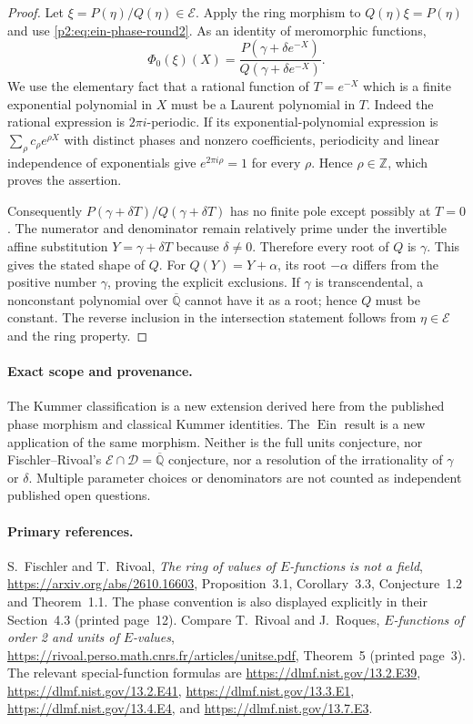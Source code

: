 \documentclass[11pt,a4paper]{article}
\theoremstyle{definition}
\theoremstyle{remark}
\numberwithin{equation}{section}
\begin{document}
\begin{proof}
Let $\xi=P(\eta)/Q(\eta)\in\mathcal E$.  Apply the ring morphism
to $Q(\eta)\xi=P(\eta)$ and use
\eqref{p2:eq:ein-phase-round2}.  As an identity of meromorphic functions,
\[
 \Phi_0(\xi)(X)=
  \frac{P(\gamma+\delta e^{-X})}
       {Q(\gamma+\delta e^{-X})}.
\]
We use the elementary fact that a rational function of $T=e^{-X}$
which is a finite exponential polynomial in $X$ must be a Laurent
polynomial in $T$.  Indeed the rational expression is $2\pi i$-periodic.
If its exponential-polynomial expression is
$\sum_{\rho}c_\rho e^{\rho X}$ with distinct phases and nonzero
coefficients, periodicity and linear independence of exponentials give
$e^{2\pi i\rho}=1$ for every $\rho$.  Hence $\rho\in\mathbb Z$,
which proves the assertion.

Consequently $P(\gamma+\delta T)/Q(\gamma+\delta T)$ has no finite
pole except possibly at $T=0$.  The numerator and denominator remain
relatively prime under the invertible affine substitution
$Y=\gamma+\delta T$ because $\delta\ne0$.  Therefore every root of
$Q$ is $\gamma$.  This gives the stated shape of $Q$.
For $Q(Y)=Y+\alpha$, its root $-\alpha$ differs from the positive
number $\gamma$, proving the explicit exclusions.
If $\gamma$ is transcendental, a nonconstant polynomial over
$\overline{\mathbb Q}$ cannot have it as a root; hence $Q$ must be
constant.  The reverse inclusion in the intersection statement follows
from $\eta\in\mathcal E$ and the ring property.
\end{proof}

\paragraph{Exact scope and provenance.}
The Kummer classification is a new extension derived here from the
published phase morphism and classical Kummer identities.  The
$\operatorname{Ein}$ result is a new application of the same morphism.
Neither is the full units conjecture, nor Fischler--Rivoal's
$\mathcal E\cap\mathcal D=\overline{\mathbb Q}$ conjecture, nor a
resolution of the irrationality of $\gamma$ or $\delta$.  Multiple
parameter choices or denominators are not counted as independent
published open questions.

\paragraph{Primary references.}
S.~Fischler and T.~Rivoal,
\emph{The ring of values of $E$-functions is not a field},
\url{https://arxiv.org/abs/2610.16603}, Proposition~3.1,
Corollary~3.3, Conjecture~1.2 and Theorem~1.1.
The phase convention is also displayed explicitly in their Section~4.3
(printed page~12).  Compare T.~Rivoal and J.~Roques,
\emph{$E$-functions of order 2 and units of $E$-values},
\url{https://rivoal.perso.math.cnrs.fr/articles/unitse.pdf}, Theorem~5
(printed page~3).
The relevant special-function formulas are
\url{https://dlmf.nist.gov/13.2.E39},
\url{https://dlmf.nist.gov/13.2.E41},
\url{https://dlmf.nist.gov/13.3.E1},
\url{https://dlmf.nist.gov/13.4.E4}, and
\url{https://dlmf.nist.gov/13.7.E3}.
\end{document}

